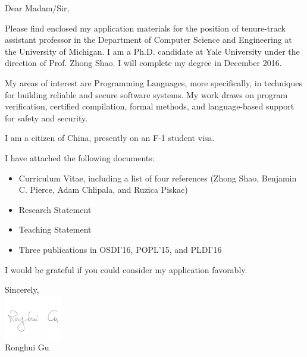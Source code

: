 \documentclass{letter}
\date{December 1, 2016}
\makeatletter
\newcommand{\subject}[1]{\def\@subject{{\centering{#1}}}}
\makeatother
\begin{document}
\begin{letter}{}

\subject{\begin{center} Re: Application for the position of tenure-track assistant professor\end{center}}


\opening{Dear Madam/Sir,}
Please find enclosed my application materials for the position of
tenure-track assistant professor in the Department of 
Computer Science and Engineering at the University of Michigan. 
I am a Ph.D. candidate at Yale University under
the direction of Prof. Zhong Shao. I will complete my degree in December 2016.


My areas of interest are Programming Languages,
more specifically, in techniques for building reliable and secure software systems. My work draws on program verification,
certified compilation, formal methods, and language-based support for safety and security.

I am a citizen of China, presently on an F-1 student visa.

I have attached the following documents:
\begin{itemize}
\item  Curriculum Vitae, including a list of four references (Zhong Shao, Benjamin C. Pierce, Adam Chlipala, and Ruzica Piskac)
\item Research Statement
\item Teaching Statement 
\item Three publications in OSDI'16, POPL'15, and PLDI'16
\end{itemize}

I would be grateful if you could consider my application favorably.




\closing{Sincerely,\\
\vspace{3pt}
\includegraphics[width=2.5cm]{signature.pdf}\\
Ronghui Gu
}

\end{letter}
\end{document}
